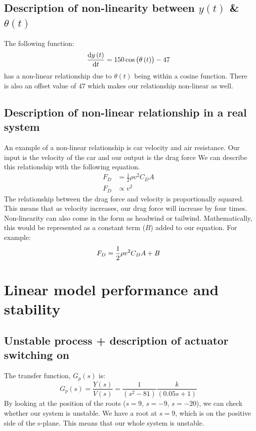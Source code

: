 \documentclass[11pt]{article}
\numberwithin{equation}{section}
\begin{document}
\subsection{Description of non-linearity between $y(t)$ \& $\theta(t)$}
The following function:
\begin{equation}
    \frac{\dif y\left( t\right)}{\dif t} = 150 \cos \left(\theta\left(t\right)\right) - 47
\end{equation}
has a non-linear relationship due to $\theta(t)$ being within a cosine function. There is also an offset value of $47$ which makes our relationship non-linear as well.
\subsection{Description of non-linear relationship in a real system}
An example of a non-linear relationship is car velocity and air resistance. Our input is the velocity of the car and our output is the drag force We can describe this relationship with the following equation.
\begin{align}
    F_D & = \frac{1}{2} \rho v^2 C_D A \\
    F_D & \propto v^2
\end{align}
The relationship between the drag force and velocity is proportionally squared. This means that as velocity increases, our drag force will increase by four times. Non-linearity can also come in the form as headwind or tailwind. Mathematically, this would be represented as a constant term ($B$) added to our equation. For example:
\begin{equation}
    F_D = \frac{1}{2} \rho v^2 C_D A + B\\
\end{equation}
\section{Linear model performance and stability}
\subsection{Unstable process + description of actuator switching on}
The transfer function, $G_p(s)$ is:
\begin{equation}
    G_p (s) = \frac{Y(s)}{V(s)} = \frac{1}{\left(s^2 - 81\right)}\frac{k}{\left(0.05s + 1\right)}
\end{equation}
By looking at the position of the roots ($s = 9$, $s = -9$, $s = -20$), we can check whether our system is unstable. We have a root at $s = 9$, which is on the positive side of the s-plane. This means that our whole system is unstable.
\end{document}
